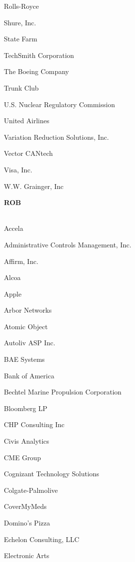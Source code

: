 \documentclass[twoside]{article}
\begin{document}
\begin{center}
\begin{multicols}{5}
\begin{FlushLeft}
\begin{compactitem}
\item Rolls-Royce
\item Shure, Inc.
\item State Farm
\item TechSmith Corporation
\item The Boeing Company
\item Trunk Club
\item U.S. Nuclear Regulatory Commission
\item United Airlines
\item Variation Reduction Solutions, Inc.
\item Vector CANtech
\item Visa, Inc.
\item W.W. Grainger, Inc
\end{compactitem}
        \end{FlushLeft}
        \vspace{.2em}
        {\fontsize{14}{16}\selectfont \bf ROB}\\
        \vspace{-1em}
        ~\hrulefill~
        \vspace{-.9em}
        \begin{FlushLeft}
        \begin{compactitem}
        \item Accela
\item Administrative Controls Management, Inc.
\item Affirm, Inc.
\item Alcoa
\item Apple
\item Arbor Networks
\item Atomic Object
\item Autoliv ASP Inc.
\item BAE Systems
\item Bank of America
\item Bechtel Marine Propulsion Corporation
\item Bloomberg LP
\item CHP Consulting Inc
\item Civis Analytics
\item CME Group
\item Cognizant Technology Solutions
\item Colgate-Palmolive
\item CoverMyMeds
\item Domino's Pizza
\item Echelon Consulting, LLC
\item Electronic Arts

\end{compactitem}
\end{FlushLeft}
\end{multicols}
\end{center}
\end{document}
